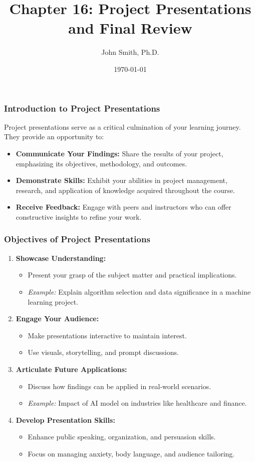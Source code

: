 \documentclass[aspectratio=169]{beamer}
\title[Project Presentations and Final Review]{Chapter 16: Project Presentations and Final Review}
\author[J. Smith]{John Smith, Ph.D.}
\institute[University Name]{
  Department of Computer Science\\
  University Name\\
  \vspace{0.3cm}
  Email: email@university.edu\\
  Website: www.university.edu
}
\date{\today}
\begin{document}
\frame{\titlepage}

\begin{frame}[fragile]
    \frametitle{Introduction to Project Presentations}
    Project presentations serve as a critical culmination of your learning journey. They provide an opportunity to:
    \begin{itemize}
        \item \textbf{Communicate Your Findings:} Share the results of your project, emphasizing its objectives, methodology, and outcomes.
        \item \textbf{Demonstrate Skills:} Exhibit your abilities in project management, research, and application of knowledge acquired throughout the course.
        \item \textbf{Receive Feedback:} Engage with peers and instructors who can offer constructive insights to refine your work.
    \end{itemize}
\end{frame}

\begin{frame}[fragile]
    \frametitle{Objectives of Project Presentations}
    \begin{enumerate}
        \item \textbf{Showcase Understanding:}
        \begin{itemize}
            \item Present your grasp of the subject matter and practical implications.
            \item \emph{Example:} Explain algorithm selection and data significance in a machine learning project.
        \end{itemize}
        
        \item \textbf{Engage Your Audience:}
        \begin{itemize}
            \item Make presentations interactive to maintain interest.
            \item Use visuals, storytelling, and prompt discussions.
        \end{itemize}
        
        \item \textbf{Articulate Future Applications:}
        \begin{itemize}
            \item Discuss how findings can be applied in real-world scenarios.
            \item \emph{Example:} Impact of AI model on industries like healthcare and finance.
        \end{itemize}
        
        \item \textbf{Develop Presentation Skills:}
        \begin{itemize}
            \item Enhance public speaking, organization, and persuasion skills.
            \item Focus on managing anxiety, body language, and audience tailoring.
        \end{itemize}
    \end{enumerate}
\end{frame}
\end{document}
